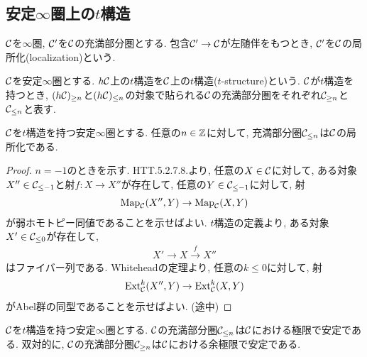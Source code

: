 \documentclass[uplatex, a4paper, 14Q, dvipdfmx]{jsarticle}
\begin{document}
\subsection{安定\texorpdfstring{$\infty$}{infty}圏上の\texorpdfstring{$t$}{t}構造}

\begin{definition}[局所化]
  $\mathcal{C}$を$\infty$圏, $\mathcal{C}'$を$\mathcal{C}$の充満部分圏とする. 
  包含$\mathcal{C}' \to \mathcal{C}$が左随伴をもつとき, $\mathcal{C}'$を$\mathcal{C}$の局所化(localization)という. 
\end{definition}

\begin{definition}
  $\mathcal{C}$を安定$\infty$圏とする.
  $h\mathcal{C}$上の$t$構造を$\mathcal{C}$上の$t$構造($t$-structure)という.
  $\mathcal{C}$が$t$構造を持つとき, $(h\mathcal{C})_{\geq n}$と$(h\mathcal{C})_{\leq n}$の対象で貼られる$\mathcal{C}$の充満部分圏をそれぞれ$\mathcal{C}_{\geq n}$と$\mathcal{C}_{\leq n}$と表す.
\end{definition}

\begin{proposition} \label{prop:Cleq_is_localization}
  $\mathcal{C}$を$t$構造を持つ安定$\infty$圏とする.
  任意の$n \in \mathbb{Z}$に対して, 充満部分圏$\mathcal{C}_{\leq n}$は$\mathcal{C}$の局所化である.
\end{proposition}

\begin{proof}
  $n=-1$のときを示す. 
  HTT.5.2.7.8.より,  任意の$X \in \mathcal{C}$に対して, ある対象$X'' \in \mathcal{C}_{\leq -1}$と射$f : X \to X''$が存在して, 任意の$Y \in \mathcal{C}_{\leq -1}$に対して, 射 
  \begin{align*}
    \mathrm{Map}_{\mathcal{C}}(X'',Y) \to \mathrm{Map}_{\mathcal{C}}(X,Y)
  \end{align*}
  が弱ホモトピー同値であることを示せばよい. 
  $t$構造の定義より, ある対象$X' \in \mathcal{C}_{\leq 0}$が存在して, 
  \begin{align*}
    X' \to X \xrightarrow{f} X''
  \end{align*}
  はファイバー列である. 
  Whiteheadの定理より, 任意の$k \leq 0$に対して, 射 
  \begin{align*}
    \mathrm{Ext}_{\mathcal{C}}^k(X'',Y) \to \mathrm{Ext}_{\mathcal{C}}^k(X,Y)
  \end{align*}
  がAbel群の同型であることを示せばよい.
  (途中)
\end{proof}

\begin{corollary}
  $\mathcal{C}$を$t$構造を持つ安定$\infty$圏とする.
  $\mathcal{C}$の充満部分圏$\mathcal{C}_{\leq n}$は$\mathcal{C}$における極限で安定である.
  双対的に, $\mathcal{C}$の充満部分圏$\mathcal{C}_{\geq n}$は$\mathcal{C}$における余極限で安定である.
\end{corollary}
\end{document}
